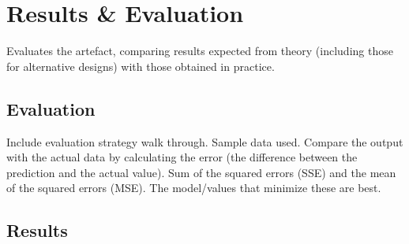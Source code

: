 \chapter{Results \& Evaluation}
Evaluates the artefact, comparing results expected from theory (including those for alternative designs) with those obtained in practice.
\section{Evaluation}
Include evaluation strategy walk through. Sample data used.
Compare the output with the actual data by calculating the error (the difference between the prediction and the actual value). Sum of the squared errors (SSE) and the mean of the squared errors (MSE). The model/values that minimize these are best.
\section{Results}